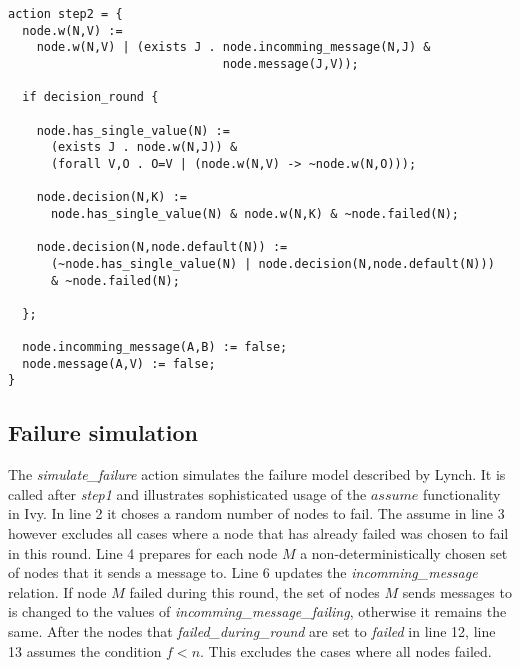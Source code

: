 \documentclass[fleqn]{article}
\begin{document}
\begin{mdframed}[backgroundcolor=light-gray, roundcorner=10pt,leftmargin=1, rightmargin=1, innerleftmargin=10, innertopmargin=15,innerbottommargin=15, outerlinewidth=1, linecolor=light-gray]
\begin{lstlisting}
action step2 = {
  node.w(N,V) :=
    node.w(N,V) | (exists J . node.incomming_message(N,J) &
                              node.message(J,V));

  if decision_round {

    node.has_single_value(N) :=
      (exists J . node.w(N,J)) &
      (forall V,O . O=V | (node.w(N,V) -> ~node.w(N,O)));

    node.decision(N,K) :=
      node.has_single_value(N) & node.w(N,K) & ~node.failed(N);

    node.decision(N,node.default(N)) :=
      (~node.has_single_value(N) | node.decision(N,node.default(N)))
      & ~node.failed(N);

  };

  node.incomming_message(A,B) := false;
  node.message(A,V) := false;
}
\end{lstlisting}
\end{mdframed}

\subsection{Failure simulation}

The \textit{simulate\_failure} action simulates the failure model described by Lynch.
It is called after \textit{step1} and illustrates sophisticated usage of the $assume$ functionality in Ivy.
In line 2 it choses a random number of nodes to fail. The assume in line 3 however excludes all
cases where a node that has already failed was chosen to fail in this round.
Line 4 prepares for each node $M$ a non-deterministically chosen set of nodes that it sends a message to.
Line 6 updates the \textit{incomming\_message} relation. If node $M$ failed during this round, the set of nodes
 $M$ sends messages to is changed to the values of \textit{incomming\_message\_failing}, otherwise it remains the same.
 After the nodes that \textit{failed\_during\_round} are set to \textit{failed} in line 12, line 13 assumes
 the condition $f<n$. This excludes the cases where all nodes failed.
\end{document}
